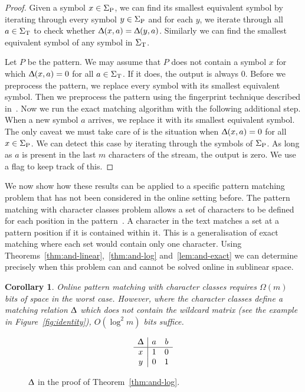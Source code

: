 \documentclass{article}
\renewcommand{\Delta}{\Updelta}
\newcommand{\SigmaP}{\ensuremath{\Sigma_{\textup{P}}}}
\newcommand{\SigmaT}{\ensuremath{\Sigma_{\textup{T}}}}
\theoremstyle{plain}
\newtheorem{corollary}[theorem]{Corollary}
\theoremstyle{definition}
\begin{document}
\begin{proof}
    Given a symbol $x\in\SigmaP$, we can find its smallest equivalent symbol by iterating through every symbol $y\in\SigmaP$ and for each $y$, we iterate through all $a\in\SigmaT$ to check whether $\Delta(x,a)=\Delta(y,a)$. Similarly we can find the smallest equivalent symbol of any symbol in $\SigmaT$.

    Let $P$ be the pattern. We may assume that $P$ does not contain a symbol $x$ for which $\Delta(x,a)=0$ for all $a\in\SigmaT$. If it does, the output is always 0. Before we preprocess the pattern, we replace every symbol with its smallest equivalent symbol. Then we preprocess the pattern using the fingerprint technique described in~\cite{Porat:09}. Now we run the exact matching algorithm with the following additional step. When a new symbol $a$ arrives, we replace it with its smallest equivalent symbol. The only caveat we must take care of is the situation when $\Delta(x,a)=0$ for all $x\in\SigmaP$. We can detect this case by iterating through the symbols of $\SigmaP$. As long as $a$ is present in the last $m$ characters of the stream, the output is zero. We use a flag to keep track of this.
\end{proof}

We now show how these results can be applied to a specific pattern matching problem that has not been considered in the online setting before. The pattern matching with character classes problem allows a set of characters to be defined for each position in the pattern~\cite{LR:2009}.  A character in the text matches a set at a pattern position if it is contained within it.  This is a generalisation of exact matching where each set would contain only one character. Using Theorems~\ref{thm:and-linear},~\ref{thm:and-log} and~\ref{lem:and-exact} we can determine precisely when this problem can and cannot be solved online in sublinear space.

\begin{corollary}
    Online pattern matching with character classes requires $\Omega(m)$ bits of space in the worst case. However, where the character classes define a matching relation $\Delta$ which does not contain the wildcard matrix (see the example in Figure~\ref{fig:identity}), $O(\log^2{m})$ bits suffice.
\end{corollary}

\begin{figure}[t]
        \begin{equation*}
            \begin{array}{c|cc}
                \Delta & a & b\\
                \hline x & 1 & 0\\
                y & 0 & 1
            \end{array}
        \end{equation*}
        \caption{\label{fig:and-log}$\Delta$ in the proof of Theorem~\ref{thm:and-log}.}
\end{figure}
\end{document}
